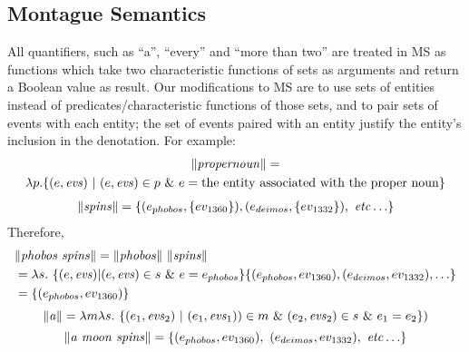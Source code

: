 \documentclass[../main.tex]{subfiles}
\begin{document}
\begin{refsection}
\subsection{Montague Semantics}

All quantifiers, such as ``a'', ``every'' and ``more than two'' are treated in MS as functions which take two characteristic functions of sets as arguments and return a Boolean value as result. Our modifications to MS are to use sets of entities instead of predicates/characteristic functions of those sets, and to pair sets of events with each entity; the set of events paired with an entity justify the entity’s inclusion in the denotation. For example:
\begin{multline*}
	\lVert \mathit{propernoun} \rVert = \\ \lambda p.
	\{(e, \mathit{evs})\ |\ (e, \mathit{evs}) \in p\ \&\ e = \mathrm{the\ entity\ associated\ with\ the\ proper\ noun}\}
\end{multline*}
\begin{equation*}
	\begin{split}
		\lVert \mathit{spins} \rVert = \{(e_{phobos}, \{ev_{\mathrm{1360}}\}),
		(e_{deimos}, \{ev_{\mathrm{1332}}\}),\ \mathit{etc}\ldots\}
	\end{split}
\end{equation*}
Therefore,
\begin{equation*}
	\begin{split}
		& \lVert \mathit{phobos\ spins} \rVert = \lVert \mathit{phobos} \rVert\ \lVert \mathit{spins} \rVert \\
		& = \lambda s.\ \{(e, \mathit{evs}) | (e, \mathit{evs}) \in s\ \&\ e = e_{phobos}\}
		 \{(e_{phobos},{ev_{\mathrm{1360}}}), (e_{deimos}, ev_{\mathrm{1332}}), \ldots\} \\
		& = \{(e_{phobos}, ev_{\mathrm{1360}})\}
	\end{split}
\end{equation*}
\begin{equation*} %
	\meaningof{a} = \lambda m \lambda s.\ \{(e_1,\evs_2)\ |\ (e_1,\evs_1) )\in m\
	\&\ (e_2,\evs_2) \in s\ \&\ e_1 = e_2\})
\end{equation*}
\begin{equation*}
	\lVert \mathit{a\ moon\ spins} \rVert =
	\{(e_{phobos}, ev_{\mathrm{1360}}),\ (e_{deimos}, ev_{\mathrm{1332}}),\ \mathit{etc}\ldots\}
\end{equation*}




\end{refsection}
\end{document}
